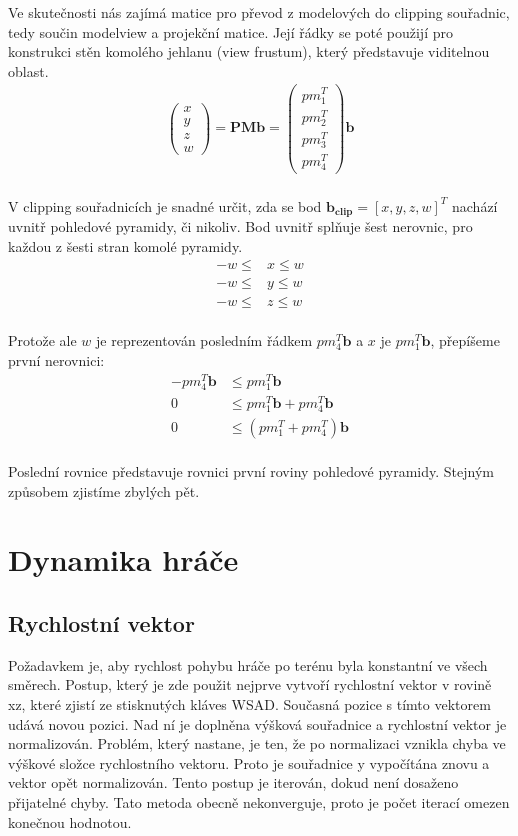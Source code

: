 \documentclass[11pt]{article}
\begin{document}
Ve skutečnosti nás zajímá matice pro převod z modelových do clipping souřadnic, tedy součin modelview a projekční matice. Její řádky se poté použijí pro konstrukci stěn komolého jehlanu (view frustum), který představuje viditelnou oblast.
\begin{align*}
\begin{pmatrix}x\\y\\z\\w\end{pmatrix} = \mathbf{PM} \mathbf{b} = \begin{pmatrix}pm_1^T\\pm_2^T\\pm_3^T\\pm_4^T\end{pmatrix} \mathbf{b}\\
\end{align*}

V clipping souřadnicích je snadné určit, zda se bod $\mathbf{b_{clip}} = \left[
x, y, z, w \right]^T$ nachází uvnitř pohledové pyramidy, či nikoliv. Bod uvnitř splňuje šest nerovnic, pro každou z šesti stran komolé pyramidy.
\begin{align*}
-w \leq & x \leq w \\
-w \leq & y \leq w \\
-w \leq & z \leq w \\
\end{align*}

Protože ale $w$ je reprezentován posledním řádkem $pm_4^T \mathbf{b}$ a $x$ je $pm_1^T \mathbf{b}$, přepíšeme první nerovnici:
\begin{align*}
-pm_4^T \mathbf{b} &\leq pm_1^T \mathbf{b} \\ 
0 &\leq pm_1^T \mathbf{b} + pm_4^T \mathbf{b} \\
0 &\leq (pm_1^T + pm_4^T) \mathbf{b} \\
\end{align*}

Poslední rovnice představuje rovnici první roviny pohledové pyramidy. Stejným způsobem zjistíme zbylých pět. 



\section{Dynamika hráče}
\subsection{Rychlostní vektor}
Požadavkem je, aby rychlost pohybu hráče po terénu byla konstantní ve všech
směrech. Postup, který je zde použit nejprve vytvoří rychlostní vektor v rovině
xz, které zjistí ze stisknutých kláves WSAD. Současná pozice s tímto vektorem
udává novou pozici. Nad ní je doplněna výšková souřadnice a rychlostní vektor
je normalizován. Problém, který nastane, je ten, že po normalizaci vznikla
chyba ve výškové složce rychlostního vektoru. Proto je souřadnice y vypočítána
znovu a vektor opět normalizován. Tento postup je iterován, dokud není dosaženo
přijatelné chyby. Tato metoda obecně nekonverguje, proto je počet iterací
omezen konečnou hodnotou.
\end{document}

